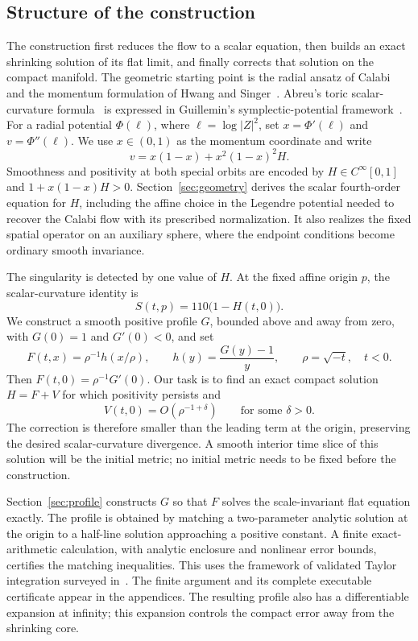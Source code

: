 \subsection{Structure of the construction}

The construction first reduces the flow to a scalar equation, then builds
an exact shrinking solution of its flat limit, and finally corrects that
solution on the compact manifold. The geometric starting point is the
radial ansatz of Calabi~\cite{Calabi1979} and the momentum formulation
of Hwang and Singer~\cite{HwangSinger2002}. Abreu's toric
scalar-curvature formula~\cite{Abreu1998} is expressed in Guillemin's
symplectic-potential framework~\cite{Guillemin1994}.
For a radial potential \(\Phi(\ell)\), where
\(\ell=\log|Z|^2\), set \(x=\Phi'(\ell)\) and
\(v=\Phi''(\ell)\). We use \(x\in(0,1)\) as the momentum
coordinate and write
\[
 v=x(1-x)+x^2(1-x)^2H.
\]
Smoothness and positivity at both special orbits are encoded by
\(H\in C^\infty[0,1]\) and \(1+x(1-x)H>0\).
Section~\ref{sec:geometry} derives the scalar fourth-order equation
for \(H\), including the affine choice in the Legendre potential
needed to recover the Calabi flow with its prescribed normalization.
It also realizes the fixed spatial operator on an auxiliary sphere,
where the endpoint conditions become ordinary smooth invariance.

The singularity is detected by one value of \(H\). At the fixed
affine origin \(p\), the scalar-curvature identity is
\[
 S(t,p)=110\bigl(1-H(t,0)\bigr).
\]
We construct a smooth positive profile \(G\), bounded above and away from
zero, with \(G(0)=1\) and \(G'(0)<0\), and set
\[
 F(t,x)=\rho^{-1}h(x/\rho),\qquad
 h(y)=\frac{G(y)-1}{y},\qquad
 \rho=\sqrt{-t},\quad t<0.
\]
Then \(F(t,0)=\rho^{-1}G'(0)\). Our task is to find an exact
compact solution \(H=F+V\) for which positivity persists and
\[
 V(t,0)=O(\rho^{-1+\delta})\qquad\text{for some }\delta>0.
\]
The correction is therefore smaller than the leading term at the
origin, preserving the desired scalar-curvature divergence. A smooth
interior time slice of this solution will be the initial metric;
no initial metric needs to be fixed before the construction.

Section~\ref{sec:profile} constructs \(G\) so that \(F\) solves the
scale-invariant flat equation exactly. The profile is obtained by
matching a two-parameter analytic solution at the origin to a half-line
solution approaching a positive constant.
A finite exact-arithmetic calculation, with analytic enclosure and
nonlinear error bounds, certifies the matching inequalities. This uses
the framework of validated Taylor integration surveyed
in~\cite{NedialkovJacksonCorliss1999}.
The finite argument and its complete executable certificate appear in
the appendices. The resulting profile also has a differentiable
expansion at infinity; this expansion controls the compact error away
from the shrinking core.

